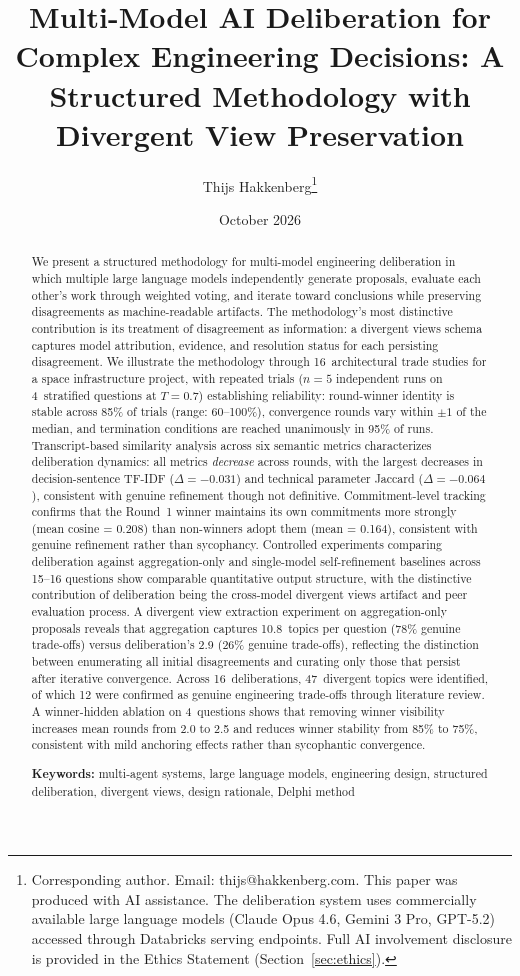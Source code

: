 \documentclass[11pt,a4paper]{article}
\title{\textbf{Multi-Model AI Deliberation for Complex Engineering Decisions: A Structured Methodology with Divergent View Preservation}}
\author{Thijs Hakkenberg\thanks{Corresponding author. Email: thijs@hakkenberg.com. This paper was produced with AI assistance. The deliberation system uses commercially available large language models (Claude Opus 4.6, Gemini 3 Pro, GPT-5.2) accessed through Databricks serving endpoints. Full AI involvement disclosure is provided in the Ethics Statement (Section~\ref{sec:ethics}).}}
\affil{Project Dyson, Open Research Initiative\\ \texttt{https://projectdyson.org}}
\date{October 2026}
\begin{document}
\maketitle

\begin{abstract}
We present a structured methodology for multi-model engineering deliberation in which multiple large language models independently generate proposals, evaluate each other's work through weighted voting, and iterate toward conclusions while preserving disagreements as machine-readable artifacts. The methodology's most distinctive contribution is its treatment of disagreement as information: a divergent views schema captures model attribution, evidence, and resolution status for each persisting disagreement. We illustrate the methodology through 16~architectural trade studies for a space infrastructure project, with repeated trials ($n = 5$ independent runs on 4~stratified questions at $T = 0.7$) establishing reliability: round-winner identity is stable across 85\% of trials (range: 60--100\%), convergence rounds vary within $\pm 1$ of the median, and termination conditions are reached unanimously in 95\% of runs. Transcript-based similarity analysis across six semantic metrics characterizes deliberation dynamics: all metrics \emph{decrease} across rounds, with the largest decreases in decision-sentence TF-IDF ($\Delta = -0.031$) and technical parameter Jaccard ($\Delta = -0.064$), consistent with genuine refinement though not definitive. Commitment-level tracking confirms that the Round~1 winner maintains its own commitments more strongly (mean cosine = 0.208) than non-winners adopt them (mean = 0.164), consistent with genuine refinement rather than sycophancy. Controlled experiments comparing deliberation against aggregation-only and single-model self-refinement baselines across 15--16 questions show comparable quantitative output structure, with the distinctive contribution of deliberation being the cross-model divergent views artifact and peer evaluation process. A divergent view extraction experiment on aggregation-only proposals reveals that aggregation captures 10.8~topics per question (78\% genuine trade-offs) versus deliberation's 2.9 (26\% genuine trade-offs), reflecting the distinction between enumerating all initial disagreements and curating only those that persist after iterative convergence. Across 16~deliberations, 47~divergent topics were identified, of which 12 were confirmed as genuine engineering trade-offs through literature review. A winner-hidden ablation on 4~questions shows that removing winner visibility increases mean rounds from 2.0 to 2.5 and reduces winner stability from 85\% to 75\%, consistent with mild anchoring effects rather than sycophantic convergence.

\medskip
\noindent\textbf{Keywords:} multi-agent systems, large language models, engineering design, structured deliberation, divergent views, design rationale, Delphi method
\end{abstract}
\end{document}
